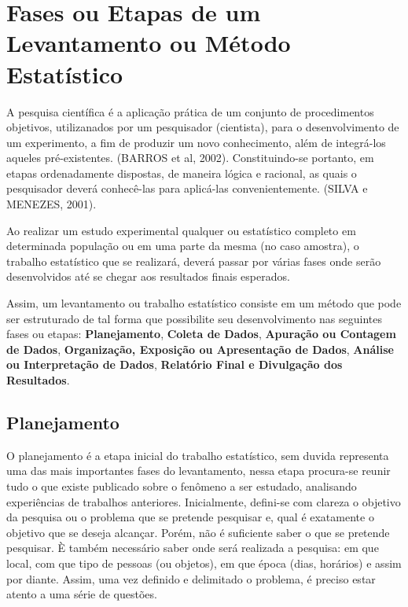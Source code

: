 \newpage
\section{Fases ou Etapas de um Levantamento ou Método Estatístico}

\inic A pesquisa científica é a aplicação prática de um conjunto de procedimentos objetivos, utilizanados por um pesquisador (cientista), para o desenvolvimento de um experimento, a fim de produzir um novo conhecimento, além de integrá-los aqueles pré-existentes. (BARROS et al, 2002). Constituindo-se portanto, em etapas ordenadamente dispostas, de maneira lógica e racional, as quais o pesquisador deverá conhecê-las para aplicá-las convenientemente. (SILVA e MENEZES, 2001). 
\vskip0.3cm


Ao realizar um estudo experimental qualquer ou estatístico completo em determinada população ou em uma parte da mesma (no caso amostra), o trabalho estatístico que se realizará, deverá passar por várias fases onde serão desenvolvidos até se chegar aos resultados finais esperados.\vskip0.3cm

Assim, um levantamento ou trabalho estatístico consiste em um
método que pode ser estruturado de tal forma que possibilite seu
desenvolvimento nas seguintes fases ou etapas:
\textbf{Planejamento}, \textbf{Coleta de Dados}, \textbf{Apuração
ou Contagem de Dados}, \textbf{Organização, Exposição ou
Apresentação de Dados}, \textbf{Análise ou Interpretação de
Dados}, \textbf{Relatório Final e Divulgação dos Resultados}.


\subsection{Planejamento}

O planejamento é a etapa inicial do trabalho estatístico, sem duvida representa uma das mais importantes fases do levantamento, nessa etapa procura-se reunir tudo o que existe publicado sobre o fe\-nô\-me\-no a ser estudado, analisando experiências de trabalhos anteriores. Inicialmente, defini-se com clareza o objetivo da pesquisa ou o problema que se pretende pesquisar e, qual é exatamente o objetivo que se deseja alcançar. Porém, não é suficiente saber o que se pretende pesquisar. È também necessário saber onde será realizada a pesquisa: em que local, com que tipo de pessoas (ou objetos), em que época (dias, horários) e assim por diante. Assim, uma vez definido e delimitado o problema, é preciso estar atento a uma série de questões.\vskip0.3cm

